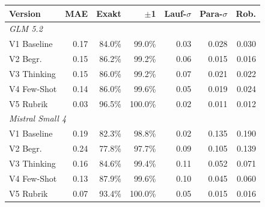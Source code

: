 \begin{tabular}{lrrrrrr}
\toprule
Version & MAE & Exakt & $\pm$1 & Lauf-$\sigma$ & Para-$\sigma$ & Rob. \\
\midrule
\multicolumn{7}{l}{\emph{GLM 5.2}} \\
V1 Baseline & 0.17 & 84.0\% & 99.0\% & 0.03 & 0.028 & 0.030 \\
V2 Begr. & 0.15 & 86.2\% & 99.2\% & 0.06 & 0.015 & 0.016 \\
V3 Thinking & 0.15 & 86.0\% & 99.2\% & 0.07 & 0.021 & 0.022 \\
V4 Few-Shot & 0.14 & 86.0\% & 99.6\% & 0.05 & 0.019 & 0.024 \\
V5 Rubrik & 0.03 & 96.5\% & 100.0\% & 0.02 & 0.011 & 0.012 \\
\midrule
\multicolumn{7}{l}{\emph{Mistral Small 4}} \\
V1 Baseline & 0.19 & 82.3\% & 98.8\% & 0.02 & 0.135 & 0.190 \\
V2 Begr. & 0.24 & 77.8\% & 97.7\% & 0.09 & 0.105 & 0.139 \\
V3 Thinking & 0.16 & 84.6\% & 99.4\% & 0.11 & 0.052 & 0.071 \\
V4 Few-Shot & 0.13 & 87.9\% & 99.6\% & 0.10 & 0.045 & 0.060 \\
V5 Rubrik & 0.07 & 93.4\% & 100.0\% & 0.05 & 0.015 & 0.016 \\
\bottomrule
\end{tabular}